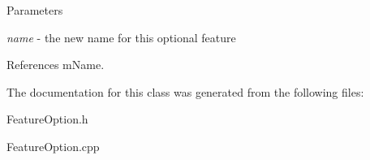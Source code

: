 \begin{DoxyParams}{Parameters}
\item[{\em name}]-\/ the new name for this optional feature \end{DoxyParams}


References mName.



The documentation for this class was generated from the following files:\begin{DoxyCompactItemize}
\item 
FeatureOption.h\item 
FeatureOption.cpp\end{DoxyCompactItemize}
